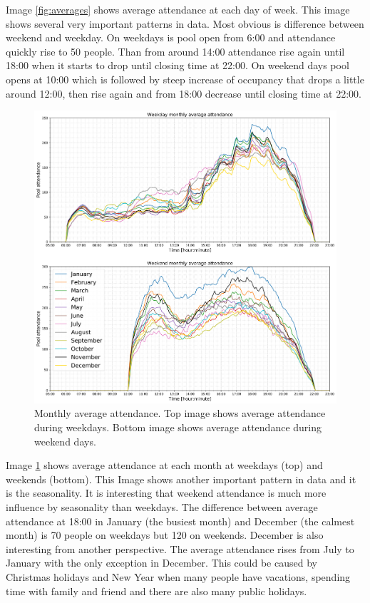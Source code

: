\documentclass{article}
\begin{document}
Image \ref{fig:averages} shows average attendance at each day of week. This image shows several very important patterns in data. Most obvious is difference between weekend and weekday. On weekdays is pool open from 6:00 and attendance quickly rise to 50 people. Than from around 14:00 attendance rise again until 18:00 when it starts to drop until closing time at 22:00. On weekend days pool opens at 10:00 which is followed by steep increase of occupancy that drops a little around 12:00, then rise again and from 18:00 decrease until closing time at 22:00.

\begin{figure}[H]
\centering
\includegraphics[width=13cm]{imgs/monthly_averages_together.png}
\caption{Monthly average attendance. Top image shows average attendance during weekdays. Bottom image shows average attendance during weekend days.}
\label{fig:monthly_averages}
\end{figure}

Image \ref{fig:monthly_averages} shows average attendance at each month at weekdays (top) and weekends (bottom). This Image shows another important pattern in data and it is the seasonality. It is interesting that weekend attendance is much more influence by seasonality than weekdays. The difference between average attendance at 18:00 in January (the busiest month) and December (the calmest month) is 70 people on weekdays but 120 on weekends. December is also interesting from another perspective. The average attendance rises from July to January with the only exception in December. This could be caused by Christmas holidays and New Year when many people have vacations, spending time with family and friend and there are also many public holidays. 
\end{document}

